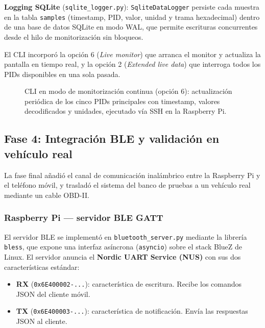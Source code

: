 \textbf{Logging SQLite} (\texttt{sqlite\_logger.py}): \texttt{SqliteDataLogger} persiste cada muestra en la tabla \texttt{samples} (timestamp, PID, valor, unidad y trama hexadecimal) dentro de una base de datos SQLite en modo WAL, que permite escrituras concurrentes desde el hilo de monitorización sin bloqueos.

El CLI incorporó la opción 6 (\textit{Live monitor}) que arranca el monitor y actualiza la pantalla en tiempo real, y la opción 2 (\textit{Extended live data}) que interroga todos los PIDs disponibles en una sola pasada.

\begin{figure}[!htbp]
\centering
\caption{CLI en modo de monitorización continua (opción 6): actualización periódica de los cinco PIDs principales con timestamp, valores decodificados y unidades, ejecutado vía SSH en la Raspberry Pi.}
\label{fig:fase3_cli_monitor}
\end{figure}


\subsection{Fase 4: Integración BLE y validación en vehículo real}
\label{sec:fase4}

La fase final añadió el canal de comunicación inalámbrico entre la Raspberry Pi y el teléfono móvil, y trasladó el sistema del banco de pruebas a un vehículo real mediante un cable OBD-II.

\subsubsection*{Raspberry Pi — servidor BLE GATT}

El servidor BLE se implementó en \texttt{bluetooth\_server.py} mediante la librería \texttt{bless}, que expone una interfaz asíncrona (\texttt{asyncio}) sobre el stack BlueZ de Linux. El servidor anuncia el \textbf{Nordic UART Service (NUS)} con sus dos características estándar:

\begin{itemize}
    \item \textbf{RX} (\texttt{0x6E400002-...}): característica de escritura. Recibe los comandos JSON del cliente móvil.
    \item \textbf{TX} (\texttt{0x6E400003-...}): característica de notificación. Envía las respuestas JSON al cliente.
\end{itemize}

